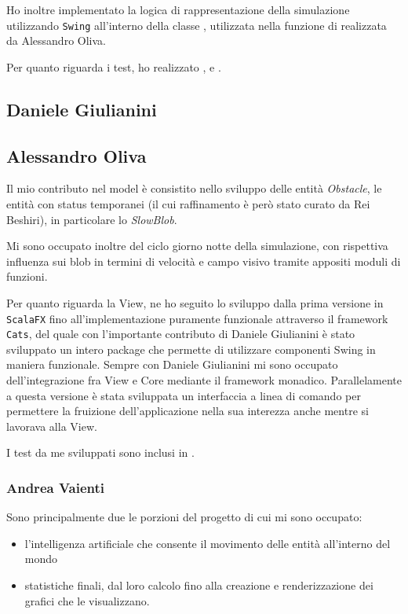 Ho inoltre implementato la logica di rappresentazione della simulazione utilizzando \texttt{Swing} all'interno della classe , utilizzata nella funzione  di  realizzata da Alessandro Oliva.

Per quanto riguarda i test, ho realizzato ,  e .

\subsection{Daniele Giulianini}

\subsection{Alessandro Oliva}
Il mio contributo nel model è consistito nello sviluppo delle entità \textit{Obstacle}, le entità con status temporanei (il cui raffinamento è però stato curato da Rei Beshiri), in particolare lo \textit{SlowBlob}.

Mi sono occupato inoltre del ciclo giorno notte della simulazione, con rispettiva influenza sui blob in termini di velocità e campo visivo tramite appositi moduli di funzioni.

Per quanto riguarda la View, ne ho seguito lo sviluppo dalla prima versione in \texttt{ScalaFX} fino all'implementazione puramente funzionale attraverso il framework \texttt{Cats}, del quale con l'importante contributo di Daniele Giulianini è stato sviluppato un intero package che permette di utilizzare componenti Swing in maniera funzionale. Sempre con Daniele Giulianini mi sono occupato dell'integrazione fra View e Core mediante il framework monadico. Parallelamente a questa versione è stata sviluppata un interfaccia a linea di comando per permettere la fruizione dell'applicazione nella sua interezza anche mentre si lavorava alla View.

I test da me sviluppati sono inclusi in .

\subsubsection{Andrea Vaienti}
Sono principalmente due le porzioni del progetto di cui mi sono occupato: 

\begin{itemize}
    \item l'intelligenza artificiale che consente il movimento delle entità all'interno del mondo
    \item statistiche finali, dal loro calcolo fino alla creazione e renderizzazione dei grafici che le visualizzano.
\end{itemize}

